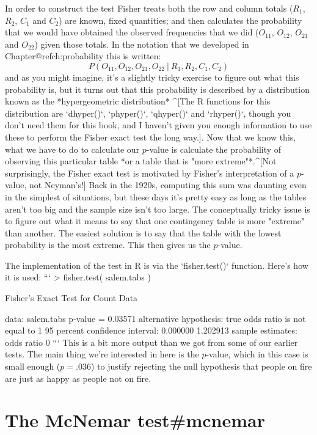 In order to construct the test Fisher treats both the row and column totals ($R_1$, $R_2$, $C_1$ and $C_2$) are known, fixed quantities; and then calculates the probability that we would have obtained the observed frequencies that we did ($O_{11}$, $O_{12}$, $O_{21}$ and $O_{22}$) given those totals. In the notation that we developed in Chapter@refch:probability this is written:
$$
P(O_{11}, O_{12}, O_{21}, O_{22} \ | \ R_1, R_2, C_1, C_2) 
$$
and as you might imagine, it's a slightly tricky exercise to figure out what this probability is, but it turns out that this probability is described by a distribution known as the *hypergeometric distribution* ^[The R functions for this distribution are `dhyper()`, `phyper()`, `qhyper()` and `rhyper()`, though you don't need them for this book, and I haven't given you enough information to use these to perform the Fisher exact test the long way.]. Now that we know this, what we have to do to calculate our $p$-value is calculate the probability of observing this particular table *or a table that is "more extreme"*.^[Not surprisingly, the Fisher exact test is motivated by Fisher's interpretation of a $p$-value, not Neyman's!] Back in the 1920s, computing this sum was daunting even in the simplest of situations, but these days it's pretty easy as long as the tables aren't too big and the sample size isn't too large. The conceptually tricky issue is to figure out what it means to say that one contingency table is more "extreme" than another. The easiest solution is to say that the table with the lowest probability is the most extreme. This then gives us the $p$-value. 

The implementation of the test in R is via the `fisher.test()` function. Here's how it is used:
```
> fisher.test( salem.tabs )

	Fisher's Exact Test for Count Data

data:  salem.tabs 
p-value = 0.03571
alternative hypothesis: true odds ratio is not equal to 1 
95 percent confidence interval:
 0.000000 1.202913 
sample estimates:
odds ratio 
         0 
```
This is a bit more output than we got from some of our earlier tests. The main thing we're interested in here is the $p$-value, which in this case is small enough ($p=.036$) to justify rejecting the null hypothesis that people on fire are just as happy as people not on fire. 


\section{The McNemar test{#mcnemar}}

